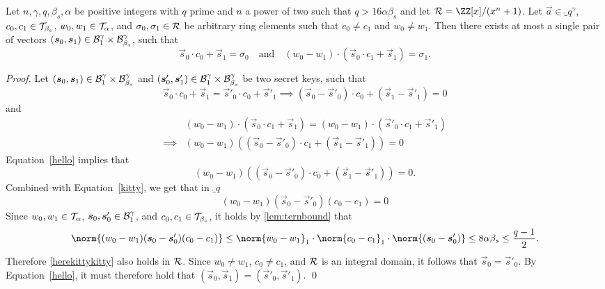 \begin{lemma}\label{lem:nilssupportivechildsupport}
Let $n,\gamma,q,\beta_s, \alpha$ be positive integers with $q$ prime and $n$ a power of two such that $q > 16 \alpha \beta_s $ and let $\ring=\ZZ[x]/(x^n+1)$. Let $\vec{a}\in\ring_q^\gamma$, $c_0,c_1 \in \mathcal{T}_{\beta_{s}}$, $w_0, w_1 \in \mathcal{T}_\alpha$, and $\sigma_0,\sigma_1 \in \mathcal{R}$ be arbitrary ring elements such that $c_0\neq c_1$ and $w_0 \neq w_1$. Then there exists at most a single pair of vectors $(\boldsymbol{s}_0,\boldsymbol{s}_1)\in\mathcal{B}^\gamma_{1}\times \mathcal{B}^\gamma_{\beta_s}$, such that
    \[\vec{s}_0\cdot c_0 + \vec{s}_1 = \sigma_0 \quad\text{and}\quad (w_0 - w_1) \cdot (\vec{s}_0\cdot c_1 + \vec{s}_1) = \sigma_1.\]
\end{lemma}
 \begin{proof}
    Let $(\boldsymbol{s}_0, \boldsymbol{s}_1)\in\mathcal{B}^\gamma_{1}\times \mathcal{B}^\gamma_{\beta_s}$ and $(\boldsymbol{s}'_0, \boldsymbol{s}'_1)\in\mathcal{B}^\gamma_{1}\times \mathcal{B}^\gamma_{\beta_s}$ be two secret keys, such that 
    \begin{equation}
    \vec{s}_0\cdot c_0 + \vec{s}_1 = \vec{s}'_0\cdot c_0 + \vec{s}'_1 \implies (\vec{s}_0 - \vec{s}'_0)\cdot c_0 + (\vec{s}_1 - \vec{s}'_1) = 0 \label{hello}
    \end{equation}
    and 
    \begin{equation}
    \begin{aligned}
    &(w_0 - w_1) \cdot (\vec{s}_0\cdot c_1 + \vec{s}_1) = (w_0 - w_1) \cdot (\vec{s}'_0\cdot c_1 + \vec{s}'_1)\\ \implies& (w_0 - w_1)((\vec{s}_0 - \vec{s}'_0)\cdot c_1 + (\vec{s}_1 - \vec{s}'_1)) = 0 \label{kitty}
    \end{aligned}
    \end{equation}
    Equation~\ref{hello} implies that 
    \[
    (w_0 - w_1)((\vec{s}_0 - \vec{s}'_0)\cdot c_0 + (\vec{s}_1 - \vec{s}'_1)) = 0.
    \]
    Combined with Equation~\ref{kitty}, we get that in $\ring_q$
    \begin{equation}
    (w_0 - w_1)(\vec{s}_0 - \vec{s}'_0) (c_0 - c_1)  = 0 \label{herekittykitty}
    \end{equation}
    Since $w_0,w_1\in\mathcal{T}_\alpha$, $\boldsymbol{s}_0,\boldsymbol{s}'_0 \in \mathcal{B}^\gamma_{1}$, and $c_0,c_1\in\mathcal{T}_{\beta_{s}}$, it holds by \autoref{lem:ternbound} that
    \[
      \norm{(w_0 - w_1)(\vec{s}_0 - \vec{s}'_0) (c_0 - c_1)} \leq \norm{w_0 - w_1}_1\cdot\norm{c_0 - c_1}_1\cdot \norm{(\vec{s}_0 - \vec{s}'_0)} \leq 8\alpha\beta_s \leq \frac{q-1}{2}.
    \]
    Therefore \autoref{herekittykitty} also holds in $\mathcal{R}$.
    Since $w_0 \neq w_1$, $c_0 \neq c_1$, and $\mathcal{R}$ is an integral domain, it follows that $\vec{s}_0 = \vec{s}'_0$.
    By Equation~\ref{hello}, it must therefore hold that $(\vec{s}_0, \vec{s}_1) = (\vec{s}'_0, \vec{s}'_1)$.
    \qed
\end{proof}
